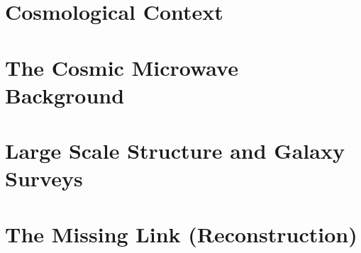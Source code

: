 \Huge

\section{Cosmological Context}

\section{The Cosmic Microwave Background}

\section{Large Scale Structure and Galaxy Surveys}

\section{The Missing Link (Reconstruction)}

